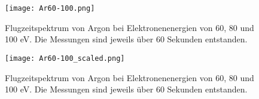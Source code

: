 \begin{figure}
    \centering
    \texttt{[image: Ar60-100.png]}
    \caption[Flugzeitspektrum von Argon bei Elektronenenergie 60, 80 und 100 eV]{Flugzeitspektrum von Argon bei Elektronenenergien von 60, 80 und 100 eV. Die Messungen sind jeweils über 60 Sekunden entstanden.}
    \label{fig:ar}
\end{figure}

\begin{figure}
    \centering
    \texttt{[image: Ar60-100\_scaled.png]}
    \caption[Skaliertes Massenspektrum von Argon bei Elektronenenergie 100 eV]{Flugzeitspektrum von Argon bei Elektronenenergien von 60, 80 und 100 eV. Die Messungen sind jeweils über 60 Sekunden entstanden.}
    \label{fig:ar_scaled}
\end{figure}


